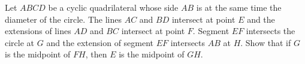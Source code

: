 Let $ABCD$ be a cyclic quadrilateral whose side $AB$ is at the same time the diameter of the circle. The lines $AC$ and $BD$ intersect at point $E$ and the extensions of lines $AD$ and $BC$ intersect at point $F$. Segment $EF$ intersects the circle at $G$ and the extension of segment $EF$ intersects $AB$ at $H$. Show that if $G$ is the midpoint of $FH$, then $E$ is the midpoint of $GH$.